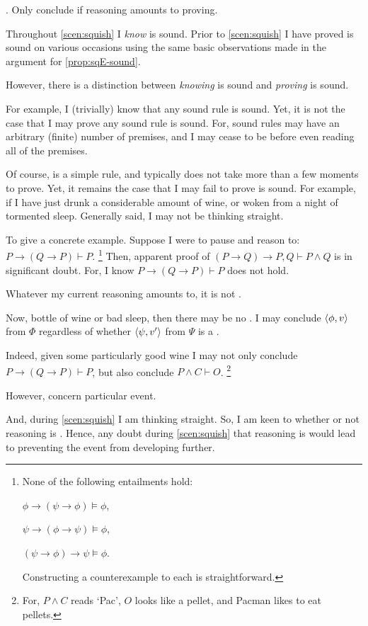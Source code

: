\begin{note}
  .
  Only conclude if reasoning amounts to proving.

  Throughout \autoref{scen:squish} I \emph{know} \sqE{} is sound.
  Prior to \autoref{scen:squish} I have proved \sqE{} is sound on various occasions using the same basic observations made in the argument for \autoref{prop:sqE-sound}.

  However, there is a distinction between \emph{knowing} \sqE{} is sound and \emph{proving} \sqE{} is sound.

  For example, I (trivially) know that any sound rule is sound.
  Yet, it is not the case that I may prove any sound rule is sound.
  For, sound rules may have an arbitrary (finite) number of premises, and I may cease to be before even reading all of the premises.

  Of course, \sqE{} is a simple rule, and typically does not take more than a few moments to prove.
  Yet, it remains the case that I may fail to prove \sqE{} is sound.
  For example, if I have just drunk a considerable amount of wine, or woken from a night of tormented sleep.
  Generally said, I may not be thinking straight.

  To give a concrete example.
  Suppose I were to pause and reason to:
  \(P \rightarrow (Q \rightarrow P) \vdash P\).%
  \footnote{
    None of the following entailments hold:
    \begin{enumerate*}[noitemsep, label=]
    \item
      \(\phi \rightarrow (\psi \rightarrow \phi) \vDash \phi\),
    \item
      \(\psi \rightarrow (\phi \rightarrow \psi) \vDash \phi\),
    \item
      \((\psi \rightarrow \phi) \rightarrow \psi \vDash \phi\).
    \end{enumerate*}
    Constructing a counterexample to each is straightforward.
  }
  Then, apparent proof of \((P \rightarrow Q) \rightarrow P, Q \vdash P \land Q\) is in significant doubt.
  For, I know \(P \rightarrow (Q \rightarrow P) \vdash P\) does not hold.

  Whatever my current reasoning amounts to, it is not \tR{}.
\end{note}

\begin{note}
  Now, bottle of wine or bad sleep, then there may be no .
  I may conclude \(\langle \phi, v \rangle\) from \(\Phi\) regardless of whether \(\langle \psi, v' \rangle\) from \(\Psi\) is a \fc{}.

  Indeed, given some particularly good wine I may not only conclude \(P \rightarrow (Q \rightarrow P) \vdash P\), but also conclude \(P \land C \vdash O\).%
  \footnote{
    For, \(P \land C\) reads `Pac', \(O\) looks like a pellet, and Pacman likes to eat pellets.
  }

  However,  concern particular event.

  And, during \autoref{scen:squish} I am thinking straight.
  So, I am {\color{blue} keen} to whether or not reasoning is .
  Hence, any doubt during \autoref{scen:squish} that reasoning is  would lead to preventing the event from developing further.
\end{note}

